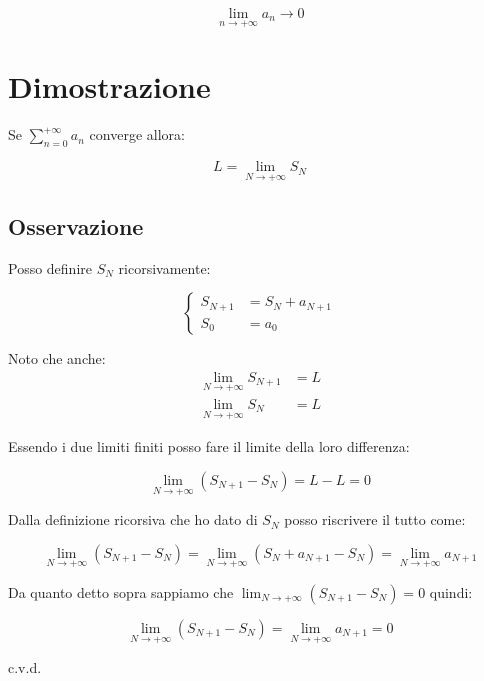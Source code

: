 \documentclass[../dimostrazioni]{subfiles}
\begin{document}
                \[  \lim_{n \to +\infty} a_n \rightarrow 0  \]

        \section*{Dimostrazione}

            Se \(\sum_{n=0}^{+\infty} a_n \) converge allora:

            \[  L = \lim_{N \to +\infty} S_N   \]

            \subsection*{Osservazione}

                Posso definire \(S_N\) ricorsivamente:

                \[  
                    \left\{
                        \begin{aligned}
                            S_{N+1} &= S_N + a_{N+1}\\
                            S_0 &= a_0
                        \end{aligned}
                    \right.
                \]

            Noto che anche:
            \begin{align*}
                \lim_{N \to +\infty} S_{N+1} &= L\\
                \lim_{N \to +\infty} S_{N} &= L
            \end{align*}
            
            Essendo i due limiti finiti posso fare il limite della loro differenza:

            \[  \lim_{N \to +\infty}\left(S_{N+1} - S_N \right) = L - L = 0  \]

            Dalla definizione ricorsiva che ho dato di \(S_N\) posso riscrivere il tutto come:

            \[  \lim_{N \to +\infty}\left(S_{N+1} - S_N \right) = \lim_{N \to +\infty} \left(S_N + a_{N+1} - S_N \right) = \lim_{N \to +\infty} a_{N+1} \]

            Da quanto detto sopra sappiamo che \(  \lim_{N \to +\infty}\left(S_{N+1} - S_N \right) = 0  \) quindi:

            \[  \lim_{N \to +\infty}\left(S_{N+1} - S_N \right) = \lim_{N \to +\infty} a_{N+1} = 0 \]

            c.v.d.
\end{document}
